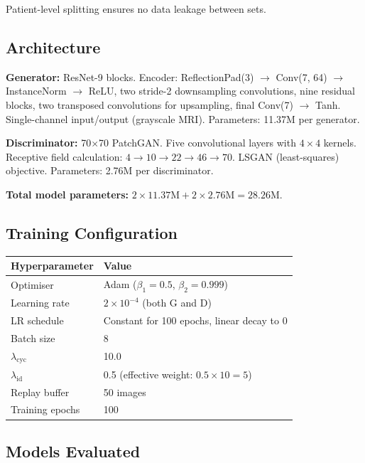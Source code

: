 \documentclass[11pt,a4paper]{article}
\theoremstyle{definition}
\begin{document}
Patient-level splitting ensures no data leakage between sets.

\subsection{Architecture}

\textbf{Generator:} ResNet-9 blocks. Encoder: ReflectionPad(3) $\to$ Conv(7, 64) $\to$ InstanceNorm $\to$ ReLU, two stride-2 downsampling convolutions, nine residual blocks, two transposed convolutions for upsampling, final Conv(7) $\to$ Tanh. Single-channel input/output (grayscale MRI). Parameters: 11.37M per generator.

\textbf{Discriminator:} 70$\times$70 PatchGAN. Five convolutional layers with $4 \times 4$ kernels. Receptive field calculation: $4 \to 10 \to 22 \to 46 \to 70$. LSGAN (least-squares) objective. Parameters: 2.76M per discriminator.

\textbf{Total model parameters:} $2 \times 11.37\text{M} + 2 \times 2.76\text{M} = 28.26\text{M}$.

\subsection{Training Configuration}

\begin{center}
\begin{tabular}{ll}
\toprule
Hyperparameter & Value \\
\midrule
Optimiser & Adam ($\beta_1 = 0.5$, $\beta_2 = 0.999$) \\
Learning rate & $2 \times 10^{-4}$ (both G and D) \\
LR schedule & Constant for 100 epochs, linear decay to 0 \\
Batch size & 8 \\
$\lambda_{\text{cyc}}$ & 10.0 \\
$\lambda_{\text{id}}$ & 0.5 (effective weight: $0.5 \times 10 = 5$) \\
Replay buffer & 50 images \\
Training epochs & 100 \\
\bottomrule
\end{tabular}
\end{center}

\subsection{Models Evaluated}
\end{document}
